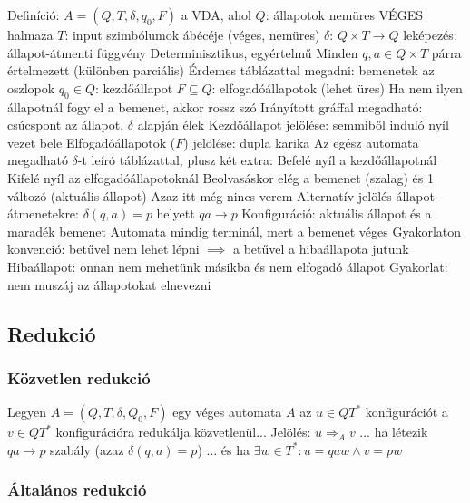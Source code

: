 \documentclass[12pt,a4paper]{article}
\newcommand{\ato}{\Rightarrow_A}
\begin{document}
\begin{outline}
	\1 Definíció: $A=(Q,T,\delta, q_0, F)$ a VDA, ahol
		\2 $Q$: állapotok nemüres VÉGES halmaza
		\2 $T$: input szimbólumok ábécéje (véges, nemüres)
		\2 $\delta$: $Q \times T \to Q$ leképezés: állapot-átmenti függvény
			\3 Determinisztikus, egyértelmű
			\3 Minden $q,a \in Q \times T$ párra értelmezett (különben parciális)
			\3 Érdemes táblázattal megadni: bemenetek az oszlopok
		\2 $q_0 \in Q$: kezdőállapot
		\2 $F \subseteq Q$: elfogadóállapotok (lehet üres)
			\3 Ha nem ilyen állapotnál fogy el a bemenet, akkor rossz szó
	\1 Irányított gráffal megadható: csúcspont az állapot, $\delta$ alapján élek
		\2 Kezdőállapot jelölése: semmiből induló nyíl vezet bele
		\2 Elfogadóállapotok ($F$) jelölése: dupla karika
	\1 Az egész automata megadható $\delta$-t leíró táblázattal, plusz két extra:
		\2 Befelé nyíl a kezdőállapotnál
		\2 Kifelé nyíl az elfogadóállapotoknál
	\1 Beolvasáskor elég a bemenet (szalag) és 1 változó (aktuális állapot)
		\2 Azaz itt még nincs verem
	\1 Alternatív jelölés állapot-átmenetekre: $\delta(q, a) = p$ helyett $qa \to p$
	\1 Konfiguráció: aktuális állapot és a maradék bemenet
	\1 Automata mindig terminál, mert a bemenet véges
	\1 Gyakorlaton konvenció: betűvel nem lehet lépni $\implies$ a betűvel a  hibaállapota jutunk
		\2 Hibaállapot: onnan nem mehetünk másikba és nem elfogadó állapot
	\1 Gyakorlat: nem muszáj az állapotokat elnevezni
\end{outline}

\pagebreak

\subsection{Redukció}

\subsubsection{Közvetlen redukció}

\begin{outline}
	\1 Legyen $A=(Q,T,\delta,Q_0,F)$ egy véges automata
	\1 $A$ az $u \in QT^*$ konfigurációt a $v \in QT^*$ konfigurációra redukálja közvetlenül...
		\2 Jelölés: $u \ato v$
	\1 ... ha létezik $qa \to p$ szabály (azaz $\delta(q,a)=p$)
	\1 ... és ha $\exists w \in T^*: u = qaw \wedge v = pw$
\end{outline}

\subsubsection{Általános redukció}
\end{document}
